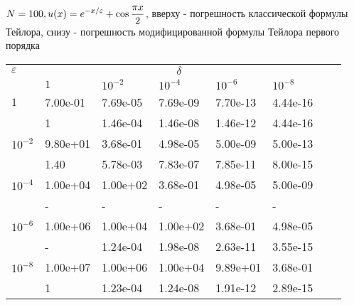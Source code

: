 \documentclass[10pt,twoside]{uz_kgu}
\begin{document}
	
	\begin{table}[!htb]
	$	{\label {tab:cub23}  N=100, \displaystyle u(x)=e^{-x /\varepsilon}+ \cos \frac{\pi x}{2} }$, вверху - погрешность классической формулы Тейлора, снизу - погрешность модифицированной формулы Тейлора первого порядка
		\begin{center}
			\begin{tabular}{|l|l|l|l|l|l|l|l|}
				\cline{1-6}  $\varepsilon$ & \multicolumn{5}{c|}{$\delta$}  \\
				\cline{2-6} &$1$ & $10^{-2}$ & $10^{-4}$  & $10^{-6}$& $10^{-8}$\\
				\cline{1-6}
				$1$
				&7.00e-01 &7.69e-05&7.69e-09&7.70e-13&4.44e-16\\
				&1 &1.46e-04 &1.46e-08 &1.46e-12&4.44e-16  \\
				\cline{1-6}
				$10^{-2}$
				&9.80e+01 &3.68e-01&4.98e-05&5.00e-09&5.00e-13\\
				&1.40         &5.78e-03&7.83e-07&7.85e-11 &8.00e-15 \\
				\cline{1-6}
				$10^{-4}$
				&1.00e+04 &1.00e+02&3.68e-01&4.98e-05&5.00e-09\\
				&-          &-         &-            &-             &-   \\
				\cline{1-6}
				$10^{-6}$
				&1.00e+06&1.00e+04&1.00e+02&3.68e-01&4.98e-05 \\
				&-         &1.24e-04 &1.98e-08&2.63e-11&3.55e-15 \\
				\cline{1-6}
				$10^{-8}$
				&1.00e+07  &1.00e+06   &1.00e+04   &9.89e+01&3.68e-01\\
				&1 &1.23e-04 &1.24e-08&1.91e-12&2.89e-15 \\
				\cline{1-6}
			\end{tabular}
		\end{center}
	\end{table}
\end{document}
